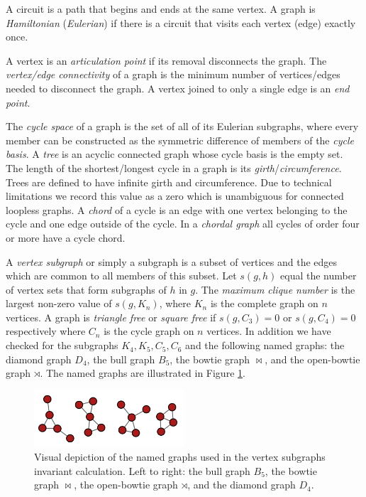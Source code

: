 \documentclass[12pt]{article}
\newcommand{\VARsubgraph}{s}
\newcommand{\subgraphBULL}{B_5}
\newcommand{\subgraphDIAMOND}{D_4}
\newcommand{\subgraphBOWTIE}{\bowtie}
\newcommand{\subgraphOPENBOWTIE}{\rtimes}
\begin{document}
\begin{appendices}
A circuit is a path that begins and ends at the same vertex.
A graph is \textit{Hamiltonian} (\textit{Eulerian}) if there is a circuit that visits each vertex (edge) exactly once.

A vertex is an \textit{articulation point} if its removal disconnects the graph. 
The \textit{vertex/edge connectivity} of a graph is the minimum number of vertices/edges needed to disconnect the graph.
A vertex joined to only a single edge is an \textit{end point}.

The \textit{cycle space} of a graph is the set of all of its Eulerian subgraphs, where every member can be constructed as the symmetric difference of members of the \textit{cycle basis}. 
A \textit{tree} is an acyclic connected graph whose cycle basis is the empty set.
The length of the shortest/longest cycle in a graph is its \textit{girth}/\textit{circumference}.
Trees are defined to have infinite girth and circumference.
Due to technical limitations we record this value as a zero which is unambiguous for connected loopless graphs.
A \textit{chord} of a cycle is an edge with one vertex belonging to the cycle and one edge outside of the cycle.
In a \textit{chordal graph} all cycles of order four or more have a cycle chord.   
 
A \textit{vertex subgraph} or simply a subgraph is a subset of vertices and the edges which are common to all members of this subset. 
Let $\VARsubgraph(g,h)$ equal the number of vertex sets that form subgraphs of $h$ in $g$.
The \textit{maximum clique number} is the largest non-zero value of $\VARsubgraph(g, K_n)$, where $K_n$ is the complete graph on $n$ vertices. 
A graph is \textit{triangle free} or \textit{square free} if $\VARsubgraph(g,C_3)=0$ or $\VARsubgraph(g,C_4)=0$ respectively where $C_n$ is the cycle graph on $n$ vertices.
In addition we have checked for the subgraphs $K_4, K_5, C_5, C_6$ and the following named graphs: the diamond graph $\subgraphDIAMOND{}$, the bull graph $\subgraphBULL{}$, the bowtie graph $\subgraphBOWTIE{}$, and the open-bowtie graph $\subgraphOPENBOWTIE{}$.
The named graphs are illustrated in Figure \ref{fig:namedgraphs}. 

\begin{figure}[h]
  \includegraphics[width=0.5\textwidth]{simple_drawings/combined_subgraphs.png}
  \caption{Visual depiction of the named graphs used in the vertex subgraphs invariant calculation.
    Left to right:
    the bull graph $\subgraphBULL{}$,
    the bowtie graph $\subgraphBOWTIE{}$, 
    the open-bowtie graph $\subgraphOPENBOWTIE{}$,
    and the diamond graph $\subgraphDIAMOND{}$.}
  \label{fig:namedgraphs}
\end{figure}


\end{appendices}
\end{document}
